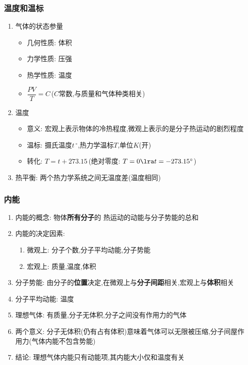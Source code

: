 \documentclass{article}
\begin{document}
\subsubsection{温度和温标}
\begin{enumerate}
    \item 气体的状态参量
          \begin{itemize}
              \item 几何性质: 体积
              \item 力学性质: 压强
              \item 热学性质: 温度
              \item $\dfrac{PV}{T} = C \,$($C$常数,与质量和气体种类相关)
          \end{itemize}
    \item 温度
          \begin{itemize}
              \item 意义: 宏观上表示物体的冷热程度,微观上表示的是分子热运动的剧烈程度
              \item 温标: 摄氏温度$t \, ^{\circ}$,热力学温标$T$,单位$K$(开)
              \item 转化: $T = t + 273.15 \,$(绝对零度: $T = 0 \lra t = -273.15^{\circ} $)
          \end{itemize}
    \item 热平衡: 两个热力学系统之间无温度差(温度相同)
\end{enumerate}

\vspace{2em}

\subsubsection{内能}
\begin{enumerate}
    \item 内能的概念: 物体\textbf{所有分子}的 热运动的动能与分子势能的总和
    \item 内能的决定因素:
          \begin{enumerate}[label = (\arabic*)]
              \item 微观上: 分子个数,分子平均动能,分子势能
              \item 宏观上: 质量,温度,体积
          \end{enumerate}
    \item 分子势能: 由分子的\textbf{位置}决定,在微观上与\textbf{分子间距}相关,宏观上与\textbf{体积}相关
    \item 分子平均动能: 温度
    \item 理想气体: 有质量,分子无体积,分子之间没有作用力的气体
    \item 两个意义: 分子无体积(仍有占有体积)意味着气体可以无限被压缩,分子间屋作用力(气体内能不包含势能)
    \item 结论: 理想气体内能只有动能项,其内能大小仅和温度有关
\end{enumerate}
\end{document}
